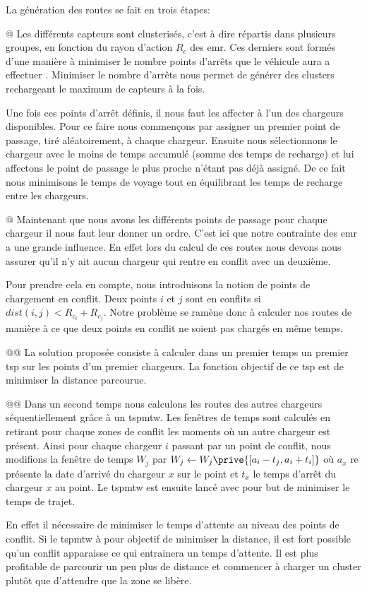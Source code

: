 \documentclass[noposter,final]{polytech/polytech}
\begin{document}
		La génération des routes se fait en trois étapes:
	
		\begin{easylist}[itemize]
			@ Les différents capteurs sont clusterisés, c'est à dire répartis dans plusieurs groupes, en fonction du rayon d'action $R_c$ des \gls{emr}.
			Ces derniers sont formés d'une manière à minimiser le nombre points d'arrêts que le véhicule aura a effectuer \cite{KHELLADI201744}.
			Minimiser le nombre d'arrêts nous permet de générer des clusters rechargeant le maximum de capteurs à la fois.
			
			Une fois ces points d'arrêt définis, il nous faut les affecter à l'un des chargeurs disponibles.
			Pour ce faire nous commençons par assigner un premier point de passage, tiré aléatoirement, à chaque chargeur.
			Ensuite nous sélectionnons le chargeur avec le moins de temps accumulé (somme des temps de recharge) et lui affectons le point de passage le plus proche n'étant pas déjà assigné.
			De ce fait nous minimisons le temps de voyage tout en équilibrant les temps de recharge entre les chargeurs.
			
			@ Maintenant que nous avons les différents points de passage pour chaque chargeur il nous faut leur donner un ordre.
			C'est ici que notre contrainte des \gls{emr} a une grande influence.
			En effet lors du calcul de ces routes nous devons nous assurer qu'il n'y ait aucun chargeur qui rentre en conflit avec un deuxième.
			
			Pour prendre cela en compte, nous introduisons la notion de points de chargement en conflit.
			Deux points $i$ et $j$ sont en conflits si $dist\left(i,j\right)<R_{c_i}+R_{c_j}$.
			Notre problème se ramène donc à calculer nos routes de manière à ce que deux points en conflit ne soient pas chargés en même temps.
			
			@@ La solution proposée consiste à calculer dans un premier temps un premier \gls{tsp} sur les points d'un premier chargeurs.
			La fonction objectif de ce \gls{tsp} est de minimiser la distance parcourue.
			
			@@ Dans un second temps nous calculons les routes des autres chargeurs séquentiellement grâce à un \gls{tspmtw}.
			Les fenêtres de temps sont calculés en retirant pour chaque zones de conflit les moments où un autre chargeur est présent.
			Ainsi pour chaque chargeur $i$ passant par un point de conflit, nous modifions la fenêtre de temps $W_j$ par $W_j\leftarrow W_j\prive{\left[a_i-t_j, a_i+t_i\right]}$ où $a_x$ re présente la date d'arrivé du chargeur $x$ sur le point et $t_x$ le temps d'arrêt du chargeur $x$ au point.
			Le \gls{tspmtw} est ensuite lancé avec pour but de minimiser le temps de trajet.
			
			En effet il nécessaire de minimiser le temps d'attente au niveau des points de conflit.
			Si le \gls{tspmtw} à pour objectif de minimiser la distance, il est fort possible qu'un conflit apparaisse ce qui entrainera un temps d'attente.
			Il est plus profitable de parcourir un peu plus de distance et commencer à charger un cluster plutôt que d'attendre que la zone se libère.
		\end{easylist}
		
\end{document}
